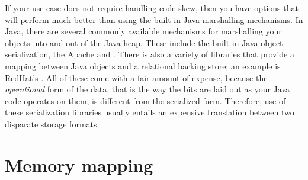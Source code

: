

If your use case does not require handling code skew, then you have options that
will perform much better than using the built-in Java marshalling mechanisms. In
Java, there are several commonly available mechanisms for marshalling your
objects into and out of the Java heap. These include the built-in Java object
serialization, the Apache  and .
There is also a variety of libraries that provide a mapping between Java objects
and a relational backing store; an example is RedHat's . All of
these come with a fair amount of expense, because the \emph{operational} form of
the data, that is the way the bits are laid out as your Java code operates on
them, is different from the serialized form. Therefore, use of these
serialization libraries usually entails an expensive translation between two
disparate storage formats.



\section{Memory mapping}
\label{sec:memory-mapping}

